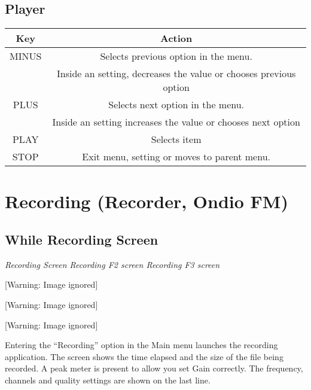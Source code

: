 \subsection{Player}

\begin{table}[h!]
  \begin{center}
    \begin{tabular}{@{}cc@{}}\toprule
      \textbf{Key} & \textbf{Action} \\\midrule
      MINUS & Selects previous option in the menu. \\
            & Inside an setting, decreases the value or chooses previous option \\
      PLUS & Selects next option in the menu. \\
           & Inside an setting increases the value or chooses next option \\
      PLAY & Selects item \\
      STOP & Exit menu, setting or moves to parent menu. \\\bottomrule
    \end{tabular}
  \end{center}
\end{table}

\section{\label{ref:Recording}Recording (Recorder, Ondio FM)}
\subsection{\label{ref:Whilerecordingscreen}While Recording Screen}
{\centering\itshape
Recording Screen  Recording F2 screen  Recording F3 screen
\par}

\begin{center}
 [Warning: Image ignored] %

\end{center}
\begin{center}
 [Warning: Image ignored] %

\end{center}
\begin{center}
 [Warning: Image ignored] %

\end{center}
Entering the ``Recording'' option in the Main menu launches the
recording application. The screen shows the time elapsed and the size
of the file being recorded. A peak meter is present to allow you set
Gain correctly.  The frequency, channels and quality settings are shown
on the last line.

